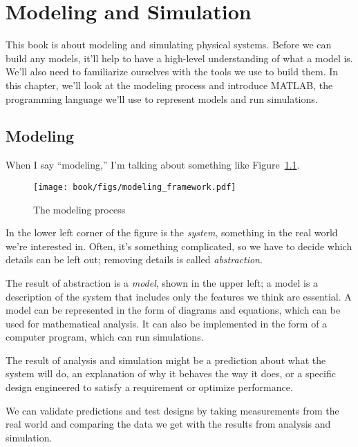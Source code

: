 \chapter{Modeling and Simulation}
\label{modeling}

This book is about modeling and simulating physical systems. Before we can build any models, it'll help to have a high-level understanding of what a model is. We'll also need to familiarize ourselves with the tools we use to build them. In this chapter, we'll look at the modeling process and introduce MATLAB, the programming language we'll use to represent models and run simulations.


\section{Modeling}

When I say ``modeling,'' I'm talking about something like Figure~\ref{fig:modeling}.
\begin{figure}[h]
  \texttt{[image: book/figs/modeling\_framework.pdf]} 
  \caption{The modeling process}
  \label{fig:modeling}
\end{figure}
In the lower left corner of the figure is the \emph{system}, something in the real world we're interested in.  Often, it's something complicated, so we have to decide which 
details can be left out; removing details is called \emph{abstraction}.  


The result of abstraction is a \emph{model}, shown in the upper left; a model is a description of the system that includes only the features we think are essential.  A model can be represented in the form of diagrams and equations, which can be used for mathematical analysis.  It can also be implemented in the form of a computer program, which can run simulations.


The result of analysis and simulation might be a prediction about what the system will do, an explanation of why it behaves the way it does, or a specific design engineered to satisfy a requirement or optimize performance.  


We can validate predictions and test designs by taking measurements from the real world and comparing the data we get with the results from analysis and simulation.

